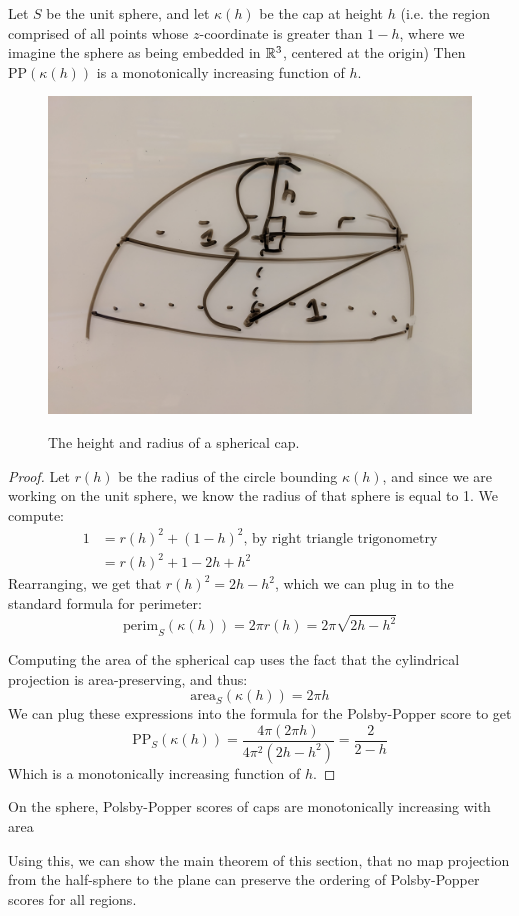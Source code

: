 \begin{lemma}\label{lem:ppscale}
Let $S$ be the unit sphere, and let $\kappa(h)$ be the cap at height $h$ (i.e. the region comprised of all points whose $z$-coordinate is greater than $1-h$, where we imagine the sphere as being embedded in $\mathbb{R}^3$, centered at the origin) Then $\mathrm{PP}(\kappa(h))$ is a monotonically increasing function of $h$.
\end{lemma}
\begin{figure}
\centering
\includegraphics[width=.5\textwidth]{figs/spherical_cap.jpg}\\[1.5em]
\caption{ The height and radius of a spherical cap. }
\label{fig:caphr}
\end{figure}

\begin{proof}
Let $r(h)$ be the radius of the circle bounding $\kappa(h)$, and since we are working on the unit sphere, we know the radius of that sphere is equal to 1. We compute:
\begin{align*}
1 &= r(h)^2 + (1-h)^2 \text {, by right triangle trigonometry}\\ 
&= r(h)^2 + 1 - 2h+h^2
\end{align*}
Rearranging, we get that $r(h)^2= 2h-h^2$, which we can plug in to the standard formula for perimeter:
$$\mathrm{perim}_S(\kappa(h)) = 2\pi r(h) = 2\pi \sqrt{2h-h^2}$$

Computing the area of the spherical cap uses the fact that the cylindrical projection is area-preserving, and thus:
$$
\mathrm{area}_S(\kappa(h)) = 2\pi h
$$
We can plug these expressions into the formula for the Polsby-Popper score to get
$$\mathrm{PP}_S(\kappa(h)) = \frac{4\pi (2\pi h) }{4 \pi^2 (2h-h^2)} = \frac{2}{2-h}$$
Which is a monotonically increasing function of $h$.
\end{proof}
\begin{corollary}\label{cor:capscale}
On the sphere, Polsby-Popper scores of caps are monotonically increasing with area
\end{corollary}
Using this, we can show the main theorem of this section, that no map projection from the half-sphere to the plane can preserve the ordering of Polsby-Popper scores for all regions.  

